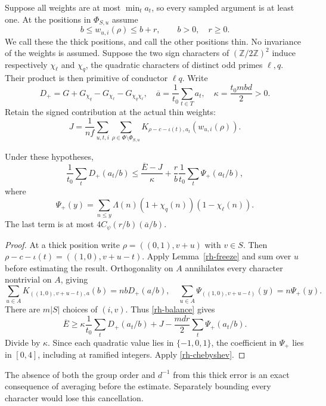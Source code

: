 Suppose all weights are at most $\min_ta_t$, so every sampled
argument is at least one. At the positions in $\Phi_{S,u}$ assume
\[
 b\le w_{u,i}(\rho)\le b+r,\qquad b>0,\quad r\ge0.
\]
We call these the thick positions, and call the other positions thin.
No invariance of the weights is assumed. Suppose the two sign characters
of $(\mathbb Z/2\mathbb Z)^2$ induce respectively $\chi_\ell$ and
$\chi_q$, the quadratic characters of distinct odd primes $\ell,q$.
Their product is then primitive of conductor $\ell q$.
Write
\[
 D_+=G+G_{\chi_q}-G_{\chi_\ell}-G_{\chi_q\chi_\ell},\quad
 \overline a=\frac1{t_0}\sum_{t\in T}a_t,\quad
 \kappa=\frac{t_0mbd}{2}>0.
\]
Retain the signed contribution at the actual thin weights:
\[
 J=\frac1{nf}\sum_{u,t,i}\sum_{\rho\in\Phi\setminus\Phi_{S,u}}
                         K_{\rho-c-\iota(t),a_t}(w_{u,i}(\rho)).
\]

\begin{theorem}
\label{rh-thick}
Under these hypotheses,
\begin{equation}\label{rh-thick-bound}
 \frac1{t_0}\sum_tD_+(a_t/b)
 \le\frac{\overline E-J}{\kappa}
        +\frac rb\frac1{t_0}\sum_t\Psi_+(a_t/b),
\end{equation}
where
\[
 \Psi_+(y)=\sum_{n\le y}\Lambda(n)
                            (1+\chi_q(n))(1-\chi_\ell(n)).
\]
The last term is at most $4C_\psi(r/b)(\overline a/b)$.
\end{theorem}

\begin{proof}
At a thick position write $\rho=((0,1),v+u)$ with $v\in S$.
Then $\rho-c-\iota(t)=((1,0),v+u-t)$. Apply Lemma~\ref{rh-freeze}
and sum over $u$ before estimating the result. Orthogonality on $A$
annihilates every character nontrivial on $A$, giving
\[
 \sum_{u\in A}K_{((1,0),v+u-t),a}(b)=nbD_+(a/b),
 \quad
 \sum_{u\in A}\Psi_{((1,0),v+u-t)}(y)=n\Psi_+(y).
\]
There are $m|S|$ choices of $(i,v)$. Thus \eqref{rh-balance} gives
\[
 \overline E\ge\kappa\frac1{t_0}\sum_tD_+(a_t/b)+J
                         -\frac{mdr}{2}\sum_t\Psi_+(a_t/b).
\]
Divide by $\kappa$. Since each quadratic value lies in
$\{-1,0,1\}$, the coefficient in $\Psi_+$ lies in $[0,4]$,
including at ramified integers. Apply \eqref{rh-chebyshev}.
\end{proof}

The absence of both the group order and $d^{-1}$ from this thick
error is an exact consequence of averaging before the estimate.
Separately bounding every character would lose this cancellation.

